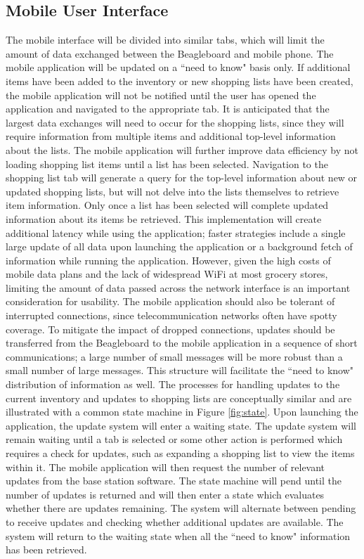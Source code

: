 \documentclass[11pt]{article} %
\begin{document}
\subsection{Mobile User Interface}
The mobile interface will be divided into similar tabs, which will limit the amount of data exchanged between the Beagleboard and mobile phone. The mobile application will be updated on a ``need to know" basis only. If additional items have been added to the inventory or new shopping lists have been created, the mobile application will not be notified until the user has opened the application and navigated to the appropriate tab. It is anticipated that the largest data exchanges will need to occur for the shopping lists, since they will require information from multiple items and additional top-level information about the lists. The mobile application will further improve data efficiency by not loading shopping list items until a list has been selected. Navigation to the shopping list tab will generate a query for the top-level information about new or updated shopping lists, but will not delve into the lists themselves to retrieve item information. Only once a list has been selected will complete updated information about its items be retrieved. This implementation will create additional latency while using the application; faster strategies include a single large update of all data upon launching the application or a background fetch of information while running the application. However, given the high costs of mobile data plans and the lack of widespread WiFi at most grocery stores, limiting the amount of data passed across the network interface is an important consideration for usability.
\newline \quad \newline
The mobile application should also be tolerant of interrupted connections, since telecommunication networks often have spotty coverage. To mitigate the impact of dropped connections, updates should be transferred from the Beagleboard to the mobile application in a sequence of short communications; a large number of small messages will be more robust than a small number of large messages. This structure will facilitate the ``need to know" distribution of information as well. The processes for handling updates to the current inventory and updates to shopping lists are conceptually similar and are illustrated with a common state machine in Figure \ref{fig:state}. Upon launching the application, the update system will enter a waiting state. The update system will remain waiting until a tab is selected or some other action is performed which requires a check for updates, such as expanding a shopping list to view the items within it. The mobile application will  then request the number of relevant updates from the base station software. The state machine will pend until the number of updates is returned and will then enter a state which evaluates whether there are updates remaining. The system will alternate between pending to receive updates and checking whether additional updates are available. The system will return to the waiting state when all the ``need to know" information has been retrieved.
\end{document}
